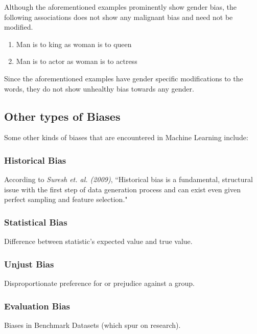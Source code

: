 \documentclass[12pt, a4paper]{article}
\begin{document}
			Although the aforementioned examples prominently show gender bias, the following associations does not show any malignant bias and need not be modified.
			
			\begin{enumerate}
				\item Man is to king as woman is to queen
				\item Man is to actor as woman is to actress
			\end{enumerate}
			
			Since the aforementioned examples have gender specific modifications to the words, they do not show unhealthy bias towards any gender.
			
		\subsection{Other types of Biases}
			Some other kinds of biases\cite{2} that are encountered in Machine Learning include:
			\subsubsection{Historical Bias}
				According to \emph{Suresh et. al. (2009)}, ``Historical bias is a fundamental, structural issue with the first step of data generation process and can exist even given perfect sampling and feature selection."
			\subsubsection{Statistical Bias}
				Difference between statistic's expected value and true value.
			\subsubsection{Unjust Bias}
				Disproportionate preference for or prejudice against a group.
			\subsubsection{Evaluation Bias}
				Biases in Benchmark Datasets (which spur on research).		
	
\end{document}

